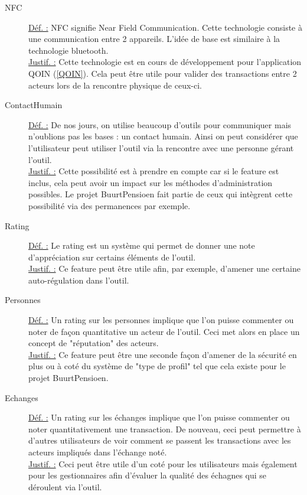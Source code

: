 \begin{description}
\item [NFC]
\underline{Déf. :}  NFC signifie Near Field Communication.  Cette technologie consiste à une communication entre 2 appareils.  L'idée de base est similaire à la technologie bluetooth.
\\ \underline{Justif. :}  Cette technologie est en cours de développement pour l'application QOIN (\ref{QOIN}).  Cela peut être utile pour valider des transactions entre 2 acteurs lors de la rencontre physique de ceux-ci.
\newline

\item [ContactHumain]
\underline{Déf. :}  De nos jours,  on utilise beaucoup d'outils pour communiquer mais n'oublions pas les bases : un contact humain.  Ainsi on peut considérer que l'utilisateur peut utiliser l'outil via la rencontre avec une personne gérant l'outil.  
\\ \underline{Justif. :}  Cette possibilité est à prendre en compte car si le feature est inclus,  cela peut avoir un impact sur les méthodes d'administration possibles.  Le projet BuurtPensioen fait partie de ceux qui intègrent cette possibilité via des permanences par exemple.  
\newline

\begin{center}
\end{center}

\item [Rating]
\underline{Déf. :}  Le rating est un système qui permet de donner une note d'appréciation sur certains éléments de l'outil.
\\ \underline{Justif. :}  Ce feature peut être utile afin,  par exemple,  d'amener une certaine auto-régulation dans l'outil.
\newline

\item [Personnes]
\underline{Déf. :}  Un rating sur les personnes implique que l'on puisse commenter ou noter de façon quantitative un acteur de l'outil.  Ceci met alors en place un concept de "réputation" des acteurs.
\\ \underline{Justif. :}  Ce feature peut être une seconde façon d'amener de la sécurité en plus ou à coté du système de "type de profil" tel que cela existe pour le projet BuurtPensioen.
\newline

\item [Echanges]
\underline{Déf. :}  Un rating sur les échanges implique que l'on puisse commenter ou noter quantitativement une transaction.  De nouveau,  ceci peut permettre à d'autres utilisateurs de voir comment se passent les transactions avec les acteurs impliqués dans l'échange noté.
\\ \underline{Justif. :}  Ceci peut être utile d'un coté pour les utilisateurs mais également pour les gestionnaires afin d'évaluer la qualité des échagnes qui se déroulent via l'outil.
\newline

\end{description}



